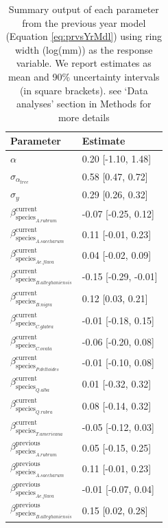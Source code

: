 \begin{table}[ht]
\centering
\caption{Summary output of each parameter from the previous year model (Equation \ref{eq:prvsYrMdl}) using ring width (log(mm)) as the response variable. We report estimates as mean and 90\% uncertainty intervals (in square brackets). see `Data analyses' section in Methods for more details} 
\label{tab:tab_PrvsYr}
\begin{tabular}{ll}
  \hline
Parameter & Estimate \\ 
  \hline
$\alpha$ & 0.20 [-1.10, 1.48] \\ 
  $\sigma_{\alpha_{tree}}$ & 0.58 [0.47, 0.72] \\ 
  $\sigma_{y}$ & 0.29 [0.26, 0.32] \\ 
  $\beta_{\text{species}_{A. rubrum}}^{\text{current}}$ & -0.07 [-0.25, 0.12] \\ 
  $\beta_{\text{species}_{A. saccharum}}^{\text{current}}$ & 0.11 [-0.01, 0.23] \\ 
  $\beta_{\text{species}_{Ae. flava}}^{\text{current}}$ & 0.04 [-0.02, 0.09] \\ 
  $\beta_{\text{species}_{B. alleghaniensis}}^{\text{current}}$ & -0.15 [-0.29, -0.01] \\ 
  $\beta_{\text{species}_{B. nigra}}^{\text{current}}$ & 0.12 [0.03, 0.21] \\ 
  $\beta_{\text{species}_{C. glabra}}^{\text{current}}$ & -0.01 [-0.18, 0.15] \\ 
  $\beta_{\text{species}_{C. ovata}}^{\text{current}}$ & -0.06 [-0.20, 0.08] \\ 
  $\beta_{\text{species}_{P. deltoides}}^{\text{current}}$ & -0.01 [-0.10, 0.08] \\ 
  $\beta_{\text{species}_{Q. alba}}^{\text{current}}$ & 0.01 [-0.32, 0.32] \\ 
  $\beta_{\text{species}_{Q. rubra}}^{\text{current}}$ & 0.08 [-0.14, 0.32] \\ 
  $\beta_{\text{species}_{T. americana}}^{\text{current}}$ & -0.05 [-0.12, 0.03] \\ 
  $\beta_{\text{species}_{A. rubrum}}^{\text{previous}}$ & 0.05 [-0.15, 0.25] \\ 
  $\beta_{\text{species}_{A. saccharum}}^{\text{previous}}$ & 0.11 [-0.01, 0.23] \\ 
  $\beta_{\text{species}_{Ae. flava}}^{\text{previous}}$ & -0.01 [-0.07, 0.04] \\ 
  $\beta_{\text{species}_{B. alleghaniensis}}^{\text{previous}}$ & 0.15 [0.02, 0.28] \\ 

\end{tabular}
\end{table}
